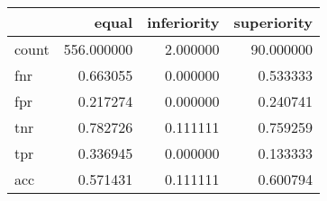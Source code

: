 \begin{tabular}{lrrr}
\toprule
{} &       equal &  inferiority &  superiority \\
\midrule
count &  556.000000 &     2.000000 &    90.000000 \\
fnr   &    0.663055 &     0.000000 &     0.533333 \\
fpr   &    0.217274 &     0.000000 &     0.240741 \\
tnr   &    0.782726 &     0.111111 &     0.759259 \\
tpr   &    0.336945 &     0.000000 &     0.133333 \\
acc   &    0.571431 &     0.111111 &     0.600794 \\
\bottomrule
\end{tabular}

